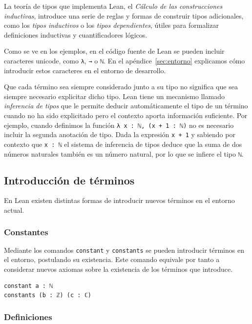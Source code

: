 La teoría de tipos que implementa Lean, el \textit{Cálculo de las
	construcciones inductivas}, introduce una serie de reglas y formas de construir
tipos adicionales, como los \textit{tipos inductivos} o los \textit{tipos
	dependientes}, útiles para formalizar definiciones inductivas y cuantificadores
lógicos.

Como se ve en los ejemplos, en el código fuente de Lean se pueden incluir
caracteres unicode, como \lstinline{λ}, \lstinline{→} o \lstinline{ℕ}.
En el apéndice~\ref{sec:entorno} explicamos cómo introducir estos caracteres
en el entorno de desarrollo.

Que cada término sea siempre considerado junto a su tipo no significa que sea
siempre necesario explicitar dicho tipo. Lean tiene un mecanismo llamado
\textit{inferencia de tipos} que le permite deducir automáticamente el tipo de
un término cuando no ha sido explicitado pero el contexto aporta información
suficiente.
Por ejemplo, cuando definimos la función \lstinline{λ x : ℕ, (x + 1 : ℕ)} no es
necesario incluir la segunda anotación de tipo. Dada la expresión
\lstinline{x + 1} y sabiendo por contexto que \lstinline{x : ℕ} el sistema de
inferencia de tipos deduce que la suma de dos números naturales también es un
número natural, por lo que se infiere el tipo \lstinline{ℕ}.

\subsection{Introducci\'{o}n de t\'{e}rminos}

En Lean existen distintas formas de introducir nuevos términos en el entorno
actual.

\subsubsection*{Constantes}%

Mediante los comandos \lstinline{constant} y \lstinline{constants} se
pueden introducir términos en el entorno, postulando su existencia. Este comando
equivale por tanto a considerar nuevos axiomas sobre la existencia de los
términos que introduce.
\begin{lstlisting}
constant a : ℕ
constants (b : ℤ) (c : ℂ)
\end{lstlisting}


\subsubsection*{Definiciones}%

